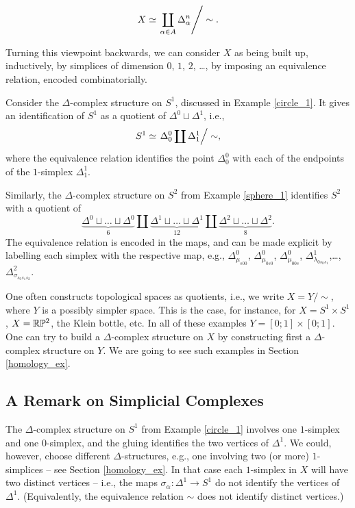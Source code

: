 \documentclass[11pt,a4paper]{report}
\begin{document}
	  \[
	  	X \simeq \left. \coprod_{\alpha\in A}\Delta^{n}_\alpha\right/ \sim.
	  \]
	  
	  Turning this viewpoint backwards, we can consider $X$ as being built up, inductively, by simplices of dimension $0$, $1$, $2$, \ldots, 
	  by imposing an equivalence relation, encoded combinatorially.
	  
	  \begin{Ex}
	  	Consider the $\Delta$-complex structure on $S^1$, discussed in Example \ref{circle_1}. It gives an identification
	  	of $S^1$ as a quotient of $\Delta^0\sqcup \Delta^1$, i.e., 
	  	\[
	  		S^1\simeq \left. \Delta_0^0\coprod \Delta^1_1\right/\sim,
	  	\]
	  	where the equivalence relation identifies the point $\Delta_0^0$ with each of the endpoints of the $1$-simplex $\Delta_1^1$.
	  	
	  	Similarly, the $\Delta$-complex structure on $S^2$ from Example  \ref{sphere_1} identifies $S^2$ with a quotient of
	  	\[
	  		\underbrace{\Delta^0\sqcup \ldots \sqcup \Delta^0}_{6}\coprod \underbrace{\Delta^1\sqcup \ldots \sqcup\Delta^1}_{12}\coprod \underbrace{\Delta^2\sqcup \ldots \sqcup\Delta^2}_{8}.
	  	\]
	  	The equivalence relation is encoded in the maps, and can be made explicit by labelling each simplex with the respective map, 
	  	e.g., $\Delta^0_{\mu_{s00}}$, $\Delta^0_{\mu_{0s0}}$, $\Delta^0_{\mu_{00s}}$, $\Delta^1_{\lambda_{0s_0s_1}}$,\ldots, $\Delta^2_{\sigma_{s_0s_1s_2}}$.


	  \end{Ex}
	  
	  One often constructs topological spaces as quotients, i.e., we write $X=Y/\sim$, where $Y$ is a possibly simpler space. This is the case, for instance, for
	  $X=S^1\times S^1$, $X=\mathbb{R}\mathbb{P}^2$, the Klein bottle, etc. In all of these examples $Y=[0;1]\times [0;1]$. One can try to build a $\Delta$-complex structure
	  on $X$ by constructing first a $\Delta$-complex structure on $Y$. We are going to see such examples in Section \ref{homology_ex}.
	  
	  \subsection*{A Remark on Simplicial Complexes}
	  
	  The $\Delta$-complex structure on $S^1$ from Example \ref{circle_1} involves one $1$-simplex and one $0$-simplex, and the gluing identifies the two vertices of
	  $\Delta^1$. We could, however, choose different $\Delta$-structures, e.g., one involving two (or more) $1$-simplices -- see Section \ref{homology_ex}.
	  In that case each $1$-simplex in $X$ will have two distinct vertices -- i.e., the maps $\sigma_\alpha:\Delta^1\to S^1$ do not identify the vertices
	  of $\Delta^1$. (Equivalently, the equivalence relation $\sim$ does not identify distinct vertices.)
	  
\end{document}
